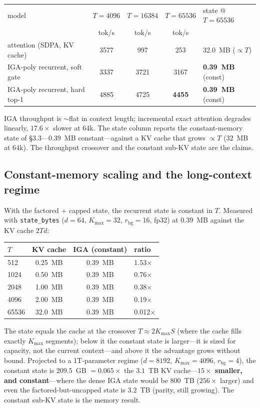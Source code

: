 \documentclass[11pt]{article}
\begin{document}
\begin{table}[h]\centering
\begin{tabular}{lcccl}
\toprule
model & $T{=}4096$ & $T{=}16384$ & $T{=}65536$ & state @ $T{=}65536$ \\
 & tok/s & tok/s & tok/s & \\
\midrule
attention (SDPA, KV cache)      & 3577 & 997 & 253 & 32.0~MB ($\propto T$) \\
IGA-poly recurrent, soft gate   & 3337 & 3721 & 3167 & \textbf{0.39~MB} (const) \\
IGA-poly recurrent, hard top-1 & 4885 & 4725 & \textbf{4455} & \textbf{0.39~MB} (const) \\
\bottomrule
\end{tabular}
\end{table}

IGA throughput is $\sim$flat in context length; incremental exact attention
degrades linearly, $17.6\times$ slower at $64$k. The state column reports the
constant-memory state of \S3.3---$0.39$~MB constant---against a KV cache that
grows $\propto T$ ($32$~MB at $64$k). The throughput crossover and the constant
sub-KV state are the claims.

\subsection{Constant-memory scaling and the long-context regime}

With the factored + capped state, the recurrent state is constant in $T$. Measured
with \texttt{state\_bytes} ($d=64$, $K_{\max}=32$, $r_{\mathrm{bg}}=16$, fp32) at
$0.39$~MB against the KV cache $2Td$:

\begin{table}[h]\centering
\begin{tabular}{lccl}
\toprule
$T$ & KV cache & IGA (constant) & ratio \\
\midrule
512   & 0.25~MB  & 0.39~MB & 1.53$\times$ \\
1024  & 0.50~MB  & 0.39~MB & 0.76$\times$ \\
2048  & 1.00~MB  & 0.39~MB & 0.38$\times$ \\
4096  & 2.00~MB  & 0.39~MB & 0.19$\times$ \\
65536 & 32.0~MB  & 0.39~MB & 0.012$\times$ \\
\bottomrule
\end{tabular}
\end{table}

The state equals the cache at the crossover $T\approx 2K_{\max}S$ (where the cache
fills exactly $K_{\max}$ segments); below it the constant state is larger---it is
sized for capacity, not the current context---and above it the advantage grows
without bound. Projected to a 1T-parameter regime ($d=8192$, $K_{\max}=4096$,
$r_{\mathrm{bg}}=4$), the constant state is $209.5$~GB $=0.065\times$ the $3.1$~TB
KV cache---\textbf{$15\times$ smaller, and constant}---where the dense IGA state
would be $800$~TB ($256\times$ larger) and even the factored-but-uncapped state is
$3.2$~TB (parity, still growing). The constant sub-KV state is the memory result.
\end{document}
